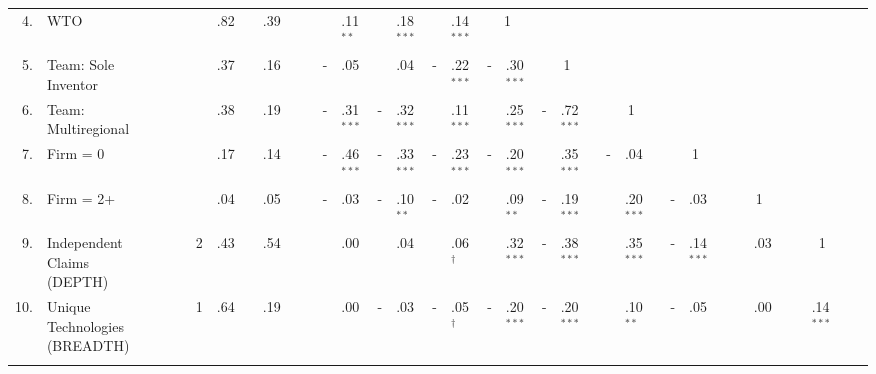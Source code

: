 \begin{sidewaystable}[!htbp]
\begin{tabularx}{0.9\textwidth}{r@{ \ \ }p{5cm}r@{}lr@{}lr@{}lr@{}lr@{}lr@{}lr@{}lr@{}lr@{}lr@{}lr@{}lr@{}lr@{}lp{1cm}}
4. & WTO & \multicolumn{2}{p{0.5cm}}{ }  & &.82 & &.39 & \multicolumn{2}{p{0.5cm}}{ }  & &.11{$^{**}$} & &.18{$^{***}$} & &.14{$^{***}$}  & \multicolumn{2}{c}{1}   & \multicolumn{2}{c}{ \  \  \  \  \  \  \ }   & \multicolumn{2}{c}{ \  \  \  \  \  \  \ }   & \multicolumn{2}{c}{ \  \  \  \  \  \  \ }   & \multicolumn{2}{c}{ \  \  \  \  \  \  \ }   & \multicolumn{2}{c}{ \  \  \  \  \  \  \ }  \\[0.33cm]
5. & Team: Sole Inventor & \multicolumn{2}{p{0.5cm}}{ }  & &.37 & &.16 & \multicolumn{2}{p{0.5cm}}{ }  & -&.05 & &.04 & -&.22{$^{***}$} & -&.30{$^{***}$}  & \multicolumn{2}{c}{1}   & \multicolumn{2}{c}{ \  \  \  \  \  \  \ }   & \multicolumn{2}{c}{ \  \  \  \  \  \  \ }   & \multicolumn{2}{c}{ \  \  \  \  \  \  \ }   & \multicolumn{2}{c}{ \  \  \  \  \  \  \ }  \\[0.33cm]
6. & Team: Multiregional & \multicolumn{2}{p{0.5cm}}{ }  & &.38 & &.19 & \multicolumn{2}{p{0.5cm}}{ }  & -&.31{$^{***}$} & -&.32{$^{***}$} & &.11{$^{***}$} & &.25{$^{***}$} & -&.72{$^{***}$}  & \multicolumn{2}{c}{1}   & \multicolumn{2}{c}{ \  \  \  \  \  \  \ }   & \multicolumn{2}{c}{ \  \  \  \  \  \  \ }   & \multicolumn{2}{c}{ \  \  \  \  \  \  \ }  \\[0.33cm]
7. & Firm = 0 & \multicolumn{2}{p{0.5cm}}{ }  & &.17 & &.14 & \multicolumn{2}{p{0.5cm}}{ }  & -&.46{$^{***}$} & -&.33{$^{***}$} & -&.23{$^{***}$} & -&.20{$^{***}$} & &.35{$^{***}$} & -&.04  & \multicolumn{2}{c}{1}   & \multicolumn{2}{c}{ \  \  \  \  \  \  \ }   & \multicolumn{2}{c}{ \  \  \  \  \  \  \ }  \\[0.33cm]
8. & Firm = 2+ & \multicolumn{2}{p{0.5cm}}{ }  & &.04 & &.05 & \multicolumn{2}{p{0.5cm}}{ }  & -&.03 & -&.10{$^{**}$} & -&.02 & &.09{$^{**}$} & -&.19{$^{***}$} & &.20{$^{***}$} & -&.03  & \multicolumn{2}{c}{1}   & \multicolumn{2}{c}{ \  \  \  \  \  \  \ }  \\[0.33cm]
9. & Independent Claims (DEPTH) & \multicolumn{2}{p{0.5cm}}{ }  & 2&.43 & &.54 & \multicolumn{2}{p{0.5cm}}{ }  & &.00 & &.04 & &.06{$^{\dagger}$} & &.32{$^{***}$} & -&.38{$^{***}$} & &.35{$^{***}$} & -&.14{$^{***}$} & &.03  & \multicolumn{2}{c}{1}  \\[0.33cm]
10. & Unique Technologies (BREADTH) & \multicolumn{2}{p{0.5cm}}{ }  & 1&.64 & &.19 & \multicolumn{2}{p{0.5cm}}{ }  & &.00 & -&.03 & -&.05{$^{\dagger}$} & -&.20{$^{***}$} & -&.20{$^{***}$} & &.10{$^{**}$} & -&.05 & &.00 & &.14{$^{***}$} \\
 & \\
\hline
\end{tabularx}

\end{sidewaystable}
